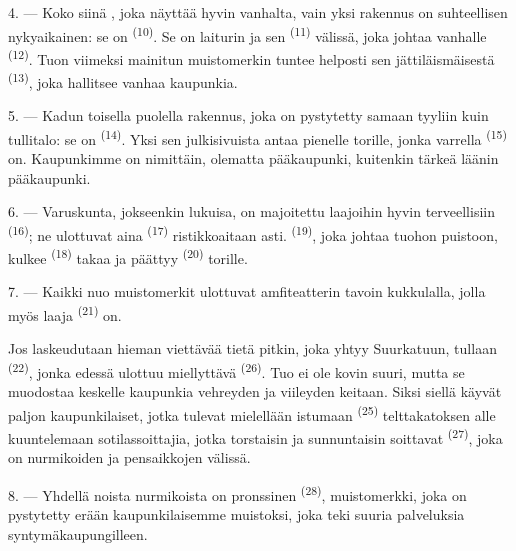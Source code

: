 4. --- Koko siinä , joka näyttää hyvin vanhalta, vain
yksi rakennus on suhteellisen nykyaikainen: se on 
\textsuperscript{(10)}. Se on laiturin ja sen 
\textsuperscript{(11)} välissä, joka johtaa vanhalle 
\textsuperscript{(12)}. Tuon viimeksi mainitun muistomerkin tuntee helposti sen
jättiläismäisestä  \textsuperscript{(13)}, joka hallitsee
vanhaa kaupunkia.

5. --- Kadun toisella puolella  rakennus, joka on pystytetty
samaan tyyliin kuin tullitalo: se on  \textsuperscript{(14)}.
Yksi sen julkisivuista antaa pienelle torille, jonka varrella
 \textsuperscript{(15)} on. Kaupunkimme on nimittäin,
olematta pääkaupunki, kuitenkin tärkeä läänin pääkaupunki.

\VUsaut{5.0mm}
\VUsaut{3.4mm}

6. --- Varuskunta, jokseenkin lukuisa, on majoitettu laajoihin hyvin terveellisiin
 \textsuperscript{(16)}; ne ulottuvat aina
 \textsuperscript{(17)} ristikkoaitaan asti.
 \textsuperscript{(19)}, joka johtaa tuohon puistoon, kulkee
 \textsuperscript{(18)} takaa ja päättyy
 \textsuperscript{(20)} torille.

7. --- Kaikki nuo muistomerkit ulottuvat amfiteatterin tavoin kukkulalla, jolla
myös laaja  \textsuperscript{(21)} on.

Jos laskeudutaan hieman viettävää tietä pitkin, joka yhtyy Suurkatuun, tullaan
 \textsuperscript{(22)}, jonka edessä ulottuu miellyttävä
 \textsuperscript{(26)}. Tuo  ei ole
kovin suuri, mutta se muodostaa keskelle kaupunkia vehreyden ja viileyden
keitaan. Siksi siellä käyvät paljon kaupunkilaiset, jotka tulevat mielellään
istumaan  \textsuperscript{(25)} telttakatoksen alle
kuuntelemaan sotilassoittajia, jotka torstaisin ja sunnuntaisin soittavat
 \textsuperscript{(27)}, joka on nurmikoiden ja pensaikkojen
välissä.

8. --- Yhdellä noista nurmikoista on pronssinen 
\textsuperscript{(28)}, muistomerkki, joka on pystytetty erään kaupunkilaisemme
muistoksi, joka teki suuria palveluksia syntymäkaupungilleen.

